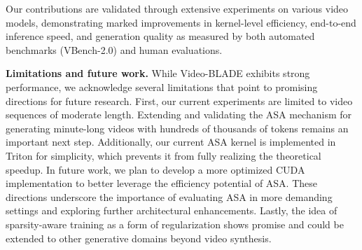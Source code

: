 \documentclass[letterpaper]{article} %
\begin{document}
Our contributions are validated through extensive experiments on various video models, demonstrating marked improvements in kernel-level efficiency, end-to-end inference speed, and generation quality as measured by both automated benchmarks (VBench-2.0) and human evaluations.

\noindent\textbf{Limitations and future work.} While Video-BLADE exhibits strong performance, we acknowledge several limitations that point to promising directions for future research. First, our current experiments are limited to video sequences of moderate length. Extending and validating the ASA mechanism for generating minute-long videos with hundreds of thousands of tokens remains an important next step. Additionally, our current ASA kernel is implemented in Triton for simplicity, which prevents it from fully realizing the theoretical speedup. In future work, we plan to develop a more optimized CUDA implementation to better leverage the efficiency potential of ASA. These directions underscore the importance of evaluating ASA in more demanding settings and exploring further architectural enhancements. Lastly, the idea of sparsity-aware training as a form of regularization shows promise and could be extended to other generative domains beyond video synthesis.







% 
\end{document}
